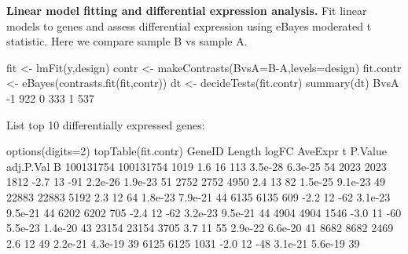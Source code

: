 \documentclass[12pt]{report}
\begin{document}
{\noindent\bf Linear model fitting and differential expression analysis.} Fit linear models to genes and assess differential expression using eBayes moderated t statistic.
Here we compare sample B vs sample A.

\begin{Rcode}
fit <- lmFit(y,design)
contr <- makeContrasts(BvsA=B-A,levels=design)
fit.contr <- eBayes(contrasts.fit(fit,contr))
dt <- decideTests(fit.contr)
summary(dt)
   BvsA
-1  922
0   333
1   537
\end{Rcode}

List top 10 differentially expressed genes: 

\begin{Rcode}
options(digits=2)
topTable(fit.contr)
             GeneID Length logFC AveExpr   t P.Value adj.P.Val  B
100131754 100131754   1019   1.6      16 113 3.5e-28   6.3e-25 54
2023           2023   1812  -2.7      13 -91 2.2e-26   1.9e-23 51
2752           2752   4950   2.4      13  82 1.5e-25   9.1e-23 49
22883         22883   5192   2.3      12  64 1.8e-23   7.9e-21 44
6135           6135    609  -2.2      12 -62 3.1e-23   9.5e-21 44
6202           6202    705  -2.4      12 -62 3.2e-23   9.5e-21 44
4904           4904   1546  -3.0      11 -60 5.5e-23   1.4e-20 43
23154         23154   3705   3.7      11  55 2.9e-22   6.6e-20 41
8682           8682   2469   2.6      12  49 2.2e-21   4.3e-19 39
6125           6125   1031  -2.0      12 -48 3.1e-21   5.6e-19 39
\end{Rcode}




\end{document}
